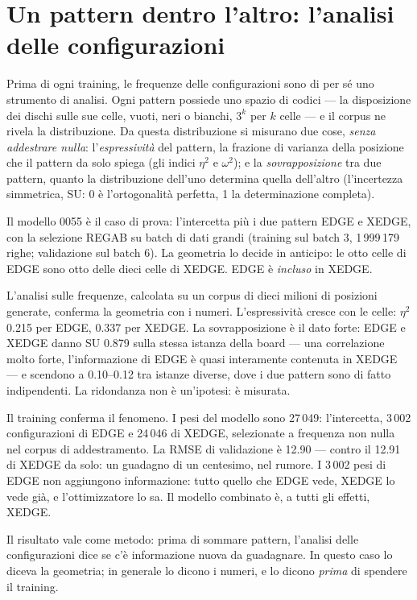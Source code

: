 \section{Un pattern dentro l'altro: l'analisi delle configurazioni}

Prima di ogni training, le frequenze delle configurazioni sono di per
sé uno strumento di analisi. Ogni pattern possiede uno spazio di
codici — la disposizione dei dischi sulle sue celle, vuoti, neri o
bianchi, $3^k$ per $k$ celle — e il corpus ne rivela la
distribuzione. Da questa distribuzione si misurano due cose,
\emph{senza addestrare nulla}: l'\emph{espressività} del pattern, la
frazione di varianza della posizione che il pattern da solo spiega
(gli indici $\eta^2$ e $\omega^2$); e la \emph{sovrapposizione} tra
due pattern, quanto la distribuzione dell'uno determina quella
dell'altro (l'incertezza simmetrica, SU: 0 è l'ortogonalità perfetta,
1 la determinazione completa).

Il modello 0055 è il caso di prova: l'intercetta più i due pattern
EDGE e XEDGE, con la selezione REGAB su batch di dati grandi
(training sul batch 3, 1\,999\,179 righe; validazione sul batch 6).
La geometria lo decide in anticipo: le otto celle di EDGE sono otto
delle dieci celle di XEDGE. EDGE è \emph{incluso} in XEDGE.

L'analisi sulle frequenze, calcolata su un corpus di dieci milioni di
posizioni generate, conferma la geometria con i numeri.
L'espressività cresce con le celle: $\eta^2$ 0.215 per EDGE, 0.337
per XEDGE. La sovrapposizione è il dato forte: EDGE e XEDGE danno
SU 0.879 sulla stessa istanza della board — una correlazione molto
forte, l'informazione di EDGE è quasi interamente contenuta in
XEDGE — e scendono a 0.10--0.12 tra istanze diverse, dove i due
pattern sono di fatto indipendenti. La ridondanza non è un'ipotesi:
è misurata.

Il training conferma il fenomeno. I pesi del modello sono
27\,049: l'intercetta, 3\,002 configurazioni di EDGE e 24\,046 di
XEDGE, selezionate a frequenza non nulla nel corpus di
addestramento. La RMSE di validazione è 12.90 — contro il 12.91 di
XEDGE da solo: un guadagno di un centesimo, nel rumore. I 3\,002 pesi
di EDGE non aggiungono informazione: tutto quello che EDGE vede,
XEDGE lo vede già, e l'ottimizzatore lo sa. Il modello combinato è,
a tutti gli effetti, XEDGE.

Il risultato vale come metodo: prima di sommare pattern, l'analisi
delle configurazioni dice se c'è informazione nuova da guadagnare. In
questo caso lo diceva la geometria; in generale lo dicono i numeri, e
lo dicono \emph{prima} di spendere il training.

